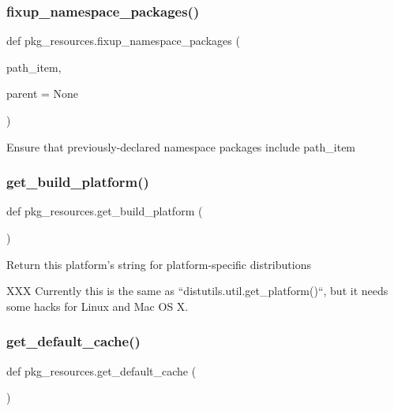 \subsubsection{\texorpdfstring{fixup\+\_\+namespace\+\_\+packages()}{fixup\_namespace\_packages()}}
{\footnotesize\ttfamily def pkg\+\_\+resources.\+fixup\+\_\+namespace\+\_\+packages (\begin{DoxyParamCaption}\item[{}]{path\+\_\+item,  }\item[{}]{parent = {\ttfamily None} }\end{DoxyParamCaption})}

\begin{DoxyVerb}Ensure that previously-declared namespace packages include path_item\end{DoxyVerb}
 \mbox{\label{namespacepkg__resources_a428a5468ed29d9fc3a2c9c7b3c69d4d8}} 
\subsubsection{\texorpdfstring{get\+\_\+build\+\_\+platform()}{get\_build\_platform()}}
{\footnotesize\ttfamily def pkg\+\_\+resources.\+get\+\_\+build\+\_\+platform (\begin{DoxyParamCaption}{ }\end{DoxyParamCaption})}

\begin{DoxyVerb}Return this platform's string for platform-specific distributions

XXX Currently this is the same as ``distutils.util.get_platform()``, but it
needs some hacks for Linux and Mac OS X.
\end{DoxyVerb}
 \mbox{\label{namespacepkg__resources_a605d91f78bde46cd2f7db04c78b9c28c}} 
\subsubsection{\texorpdfstring{get\+\_\+default\+\_\+cache()}{get\_default\_cache()}}
{\footnotesize\ttfamily def pkg\+\_\+resources.\+get\+\_\+default\+\_\+cache (\begin{DoxyParamCaption}{ }\end{DoxyParamCaption})}

